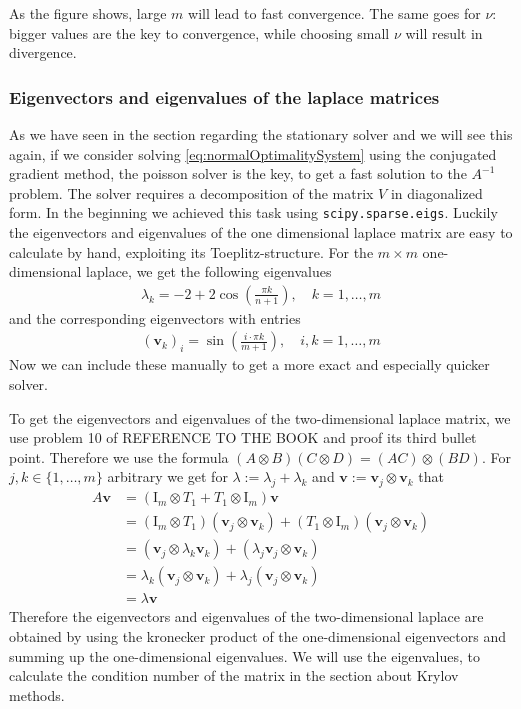 \documentclass{amsart}
\theoremstyle{definition}
\theoremstyle{remark}
\numberwithin{equation}{section}
\renewcommand{\vec}{\textbf}
\begin{document}
As the figure shows, large $m$ will lead to fast convergence. The same goes for $\nu$: bigger values are the key to convergence, while choosing small $\nu$ will result in divergence.


\subsubsection{Eigenvectors and eigenvalues of the laplace matrices}
As we have seen in the section regarding the stationary solver and we will see this again, if we consider solving \eqref{eq:normalOptimalitySystem} 
using the conjugated gradient method, the poisson solver is the key, to get a fast solution to the $A^{-1}$ problem. The solver requires a decomposition
of the matrix $V$ in diagonalized form. In the beginning we achieved this task using \texttt{scipy.sparse.eigs}. Luckily the eigenvectors and eigenvalues
of the one dimensional laplace matrix are easy to calculate by hand, exploiting its Toeplitz-structure. For the $m\times m$ one-dimensional laplace, we 
get the following eigenvalues
\begin{align*}
\lambda_k = -2 + 2 \cos \left( \frac{\pi k}{n+1} \right), \quad k=1,\ldots, m
\end{align*} 
and the corresponding eigenvectors with entries
\begin{align*}
(\vec{v}_k)_i = \sin\left(\frac{i\cdot \pi k}{m+1} \right), \quad i,k=1,\ldots,m
\end{align*}
Now we can include these manually to get a more exact and especially quicker solver.

To get the eigenvectors and eigenvalues of the two-dimensional laplace matrix, we use problem 10 of REFERENCE TO THE BOOK and proof its third bullet 
point. Therefore we use the formula $(A \otimes B)(C \otimes D) = (AC) \otimes (BD)$. For $j,k \in \{1, \ldots, m\}$ arbitrary we get for $\lambda := 
\lambda_j + \lambda_k$ and $\vec{v} := \vec{v}_j \otimes \vec{v}_k$ that
\begin{align*}
A\vec{v} &= \left(\text{I}_m \otimes T_1 + T_1 \otimes \text{I}_m \right) \vec{v}\\
&= \left( \text{I}_m \otimes T_1\right)\left(\vec{v}_j \otimes \vec{v}_k\right) + \left( T_1 \otimes \text{I}_m\right)\left(\vec{v}_j \otimes \vec{v}_k\right)\\
&= \left( \vec{v}_j \otimes \lambda_k \vec{v}_k\right) + \left( \lambda_j\vec{v}_j \otimes  \vec{v}_k\right)\\
&= \lambda_k\left( \vec{v}_j \otimes  \vec{v}_k\right) + \lambda_j\left( \vec{v}_j \otimes  \vec{v}_k\right)\\
&= \lambda \vec{v}
\end{align*}
Therefore the eigenvectors and eigenvalues of the two-dimensional laplace are obtained by using the kronecker product of the one-dimensional eigenvectors
and summing up the one-dimensional eigenvalues. We will use the eigenvalues, to calculate the condition number of the matrix in the section
about Krylov methods.
\end{document}
